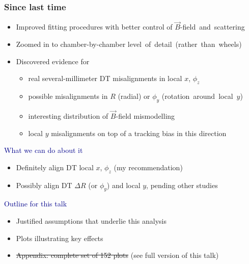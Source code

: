 \documentclass[compress]{beamer}
\begin{document}


\begin{frame}
\frametitle{Since last time}
\begin{itemize}
\item Improved fitting procedures with better control of
  \mbox{$\vec{B}$-field and scattering\hspace{-1 cm}}
\item Zoomed in to chamber-by-chamber \mbox{level of detail (rather than wheels)\hspace{-1 cm}}
\item Discovered evidence for
\begin{itemize}
\item real several-millimeter DT misalignments in local $x$, $\phi_z$
\item possible misalignments in $R$ (radial) or $\phi_y$ \mbox{(rotation around local $y$)\hspace{-1 cm}}
\item interesting distribution of $\vec{B}$-field mismodelling
\item local $y$ misalignments on top of a tracking bias in this direction
\end{itemize}
\end{itemize}

\vspace{0.1 cm}
\hspace{-0.83 cm} \textcolor{darkblue}{\Large What we can do about it}

\begin{itemize}
\item Definitely align DT local $x$, $\phi_z$ (my recommendation)
\item Possibly align DT $\Delta R$ (or $\phi_y$) and local $y$, pending other studies
\end{itemize}

\vspace{0.3 cm}
\hspace{-0.83 cm} \textcolor{darkblue}{\Large Outline for this talk}

\begin{itemize}
\item Justified assumptions that underlie this analysis
\item Plots illustrating key effects
\item \sout{Appendix: complete set of 152 plots} (see full version of this talk)
\end{itemize}
\end{frame}
\end{document}
